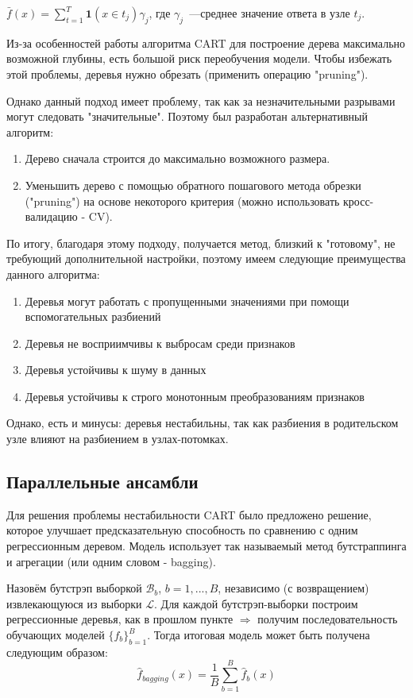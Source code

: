 \begin{center}
    $\bar{f}(x) = \sum_{t=1}^T \mathbf{1}(x \in t_j)\gamma_j$, где $\gamma_j$~---среднее значение ответа в узле $t_j$.
\end{center}

Из-за особенностей работы алгоритма CART для построение дерева максимально возможной глубины, есть большой риск переобучения модели. Чтобы избежать этой проблемы, деревья нужно обрезать (применить операцию "pruning").

Однако данный подход имеет проблему, так как за незначительными разрывами могут следовать "значительные". Поэтому был разработан альтернативный алгоритм:
\begin{enumerate}
    \item Дерево сначала строится до максимально возможного размера.
    \item Уменьшить дерево с помощью обратного пошагового метода обрезки ("pruning") на основе некоторого критерия (можно использовать кросс-валидацию - CV).
\end{enumerate}

По итогу, благодаря этому подходу, получается метод, близкий к "готовому", не требующий дополнительной настройки, поэтому имеем следующие преимущества данного алгоритма:
\begin{enumerate}
    \item Деревья могут работать с пропущенными значениями при помощи вспомогательных разбиений
    \item Деревья не восприимчивы к выбросам среди признаков
    \item Деревья устойчивы к шуму в данных
    \item Деревья устойчивы к строго монотонным преобразованиям признаков
\end{enumerate}

Однако, есть и минусы: деревья нестабильны, так как разбиения в родительском узле влияют на разбиением в узлах-потомках.

\subsection*{Параллельные ансамбли}
Для решения проблемы нестабильности CART было предложено решение, которое улучшает предсказательную способность по сравнению с одним регрессионным деревом. Модель использует так называемый метод бутстраппинга и агрегации (или одним словом - bagging).

Назовём бутстрэп выборкой $\mathcal{B}_b$, $b=1,...,B$, независимо (с возвращением) извлекающуюся из выборки $\mathcal{L}$. Для каждой бутстрэп-выборки построим регрессионные деревья, как в прошлом пункте $\Rightarrow$ получим последовательность обучающих моделей $\{f_b\}_{b=1}^B$. Тогда итоговая модель может быть получена следующим образом:
$$\hat{f}_{bagging}(x) = \frac{1}{B}\sum_{b=1}^B \hat{f}_b(x)$$

